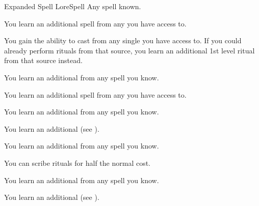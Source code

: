    \begin{feat}{Expanded Spell Lore}{Spell}
        \featpre Any spell known.

         You learn an additional spell from any  you have access to.

         You gain the ability to cast  from any single  you have access to.
        If you could already perform rituals from that source, you learn an additional 1st level ritual from that source instead.

         You learn an additional  from any spell you know.

         You learn an additional spell from any  you have access to.

         You learn an additional  from any spell you know.

         You learn an additional  (see ).

         You learn an additional  from any spell you know.

         You can scribe rituals for half the normal cost.

         You learn an additional  from any spell you know.

         You learn an additional  (see ).
        
    \end{feat}

